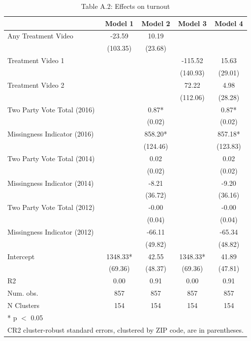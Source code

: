 \begin{table}
\centering
\caption{Table A.2: Effects on turnout}
\centering
\begin{tabular}[t]{lcccc}
\toprule
  & Model 1 & Model 2 & Model 3 & Model 4\\
\midrule
Any Treatment Video & -23.59 & 10.19 &  & \\
 & (103.35) & (23.68) &  & \\
Treatment Video 1 &  &  & -115.52 & 15.63\\
 &  &  & (140.93) & (29.01)\\
Treatment Video 2 &  &  & 72.22 & 4.98\\
 &  &  & (112.06) & (28.28)\\
Two Party Vote Total (2016) &  & 0.87* &  & 0.87*\\
 &  & (0.02) &  & \vphantom{1} (0.02)\\
Missingness Indicator (2016) &  & 858.20* &  & 857.18*\\
 &  & (124.46) &  & (123.83)\\
Two Party Vote Total (2014) &  & 0.02 &  & 0.02\\
 &  & (0.02) &  & (0.02)\\
Missingness Indicator (2014) &  & -8.21 &  & -9.20\\
 &  & (36.72) &  & (36.16)\\
Two Party Vote Total (2012) &  & -0.00 &  & -0.00\\
 &  & (0.04) &  & (0.04)\\
Missingness Indicator (2012) &  & -66.11 &  & -65.34\\
 &  & (49.82) &  & (48.82)\\
Intercept & 1348.33* & 42.55 & 1348.33* & 41.89\\
 & (69.36) & (48.37) & (69.36) & (47.81)\\
\midrule
R2 & 0.00 & 0.91 & 0.00 & 0.91\\
Num. obs. & 857 & 857 & 857 & 857\\
N Clusters & 154 & 154 & 154 & 154\\
\bottomrule
\multicolumn{5}{l}{\rule{0pt}{1em}* p $<$ 0.05}\\
\multicolumn{5}{l}{\rule{0pt}{1em}CR2 cluster-robust standard errors, clustered by ZIP code, are in parentheses.}\\
\end{tabular}
\end{table}
